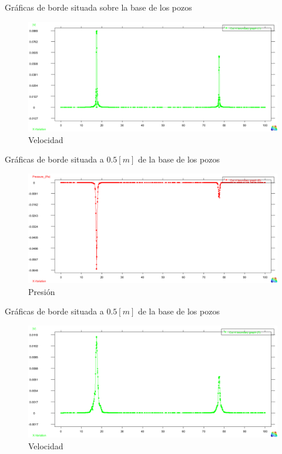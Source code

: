 \documentclass[spanish]{beamer}
\begin{document}
\begin{frame}{Gráficas de borde situada sobre la base de los pozos}
\begin{center}
\begin{figure}[htbp]
\centerline{\includegraphics[scale=0.25]{../img/100m/grf/100_grafico_velocidad_x_centro_pozos_distancia0}}
\caption{Velocidad}
\end{figure}
\end{center}
\end{frame}
%
%
\begin{frame}{Gráficas de borde situada a $0.5[m]$ de la base de los pozos}
\begin{center}
\begin{figure}[htbp]
\centerline{\includegraphics[scale=0.25]{../img/100m/grf/100_grafico_presion_x_centro_pozos_distancia05}}
\caption{Presión}
\end{figure}
\end{center}
\end{frame}
%
%
\begin{frame}{Gráficas de borde situada a $0.5[m]$ de la base de los pozos}
\begin{center}
\begin{figure}[htbp]
\centerline{\includegraphics[scale=0.25]{../img/100m/grf/100_grafico_velocidad_x_centro_pozos_distancia05}}
\caption{Velocidad}
\end{figure}
\end{center}
\end{frame}
\end{document}
